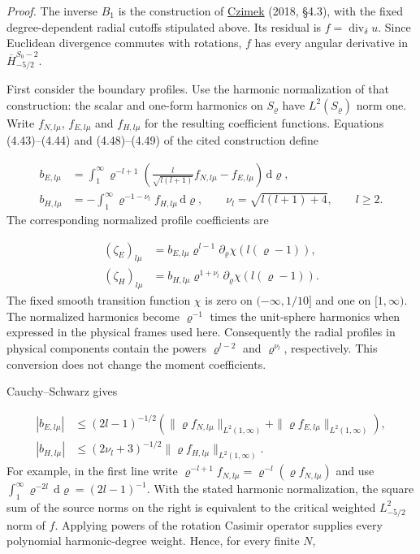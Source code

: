 \documentclass[
  english,
  11pt,
  reqno]{amsart}
\begin{document}
\emph{Proof.} The inverse \(B_1\) is the construction of
\hyperref[ref-Czimek2018]{Czimek} (2018, §4.3), with the fixed
degree-dependent radial cutoffs stipulated above. Its residual is
\(f=\operatorname{div}_\delta u\). Since Euclidean divergence commutes
with rotations, \(f\) has every angular derivative in
\(\overline H^{S_0-2}_{-5/2}\).

First consider the boundary profiles. Use the harmonic normalization of
that construction: the scalar and one-form harmonics on \(S_\varrho\)
have \(L^2(S_\varrho)\) norm one. Write \(f_{N,l\mu}\), \(f_{E,l\mu}\)
and \(f_{H,l\mu}\) for the resulting coefficient functions. Equations
(4.43)--(4.44) and (4.48)--(4.49) of the cited construction define

\label{eq:online-momentum-profile-moments} \[
\begin{aligned}
b_{E,l\mu}
 &=\int_1^\infty \varrho^{-l+1}
       \left(\frac{l}{\sqrt{l(l+1)}}f_{N,l\mu}
                          -f_{E,l\mu}\right)\,\mathrm d\varrho,\\
b_{H,l\mu}
 &=-\int_1^\infty \varrho^{-1-\nu_l}f_{H,l\mu}\,\mathrm d\varrho,
\qquad \nu_l=\sqrt{l(l+1)+4},\qquad l\ge2.
\end{aligned}
\] The corresponding normalized profile coefficients are

\label{eq:online-momentum-profile-coefficients} \[
\begin{aligned}
(\zeta_E)_{l\mu}
 &=b_{E,l\mu}\varrho^{l-1}
       \partial_\varrho\chi(l(\varrho-1)),\\
(\zeta_H)_{l\mu}
 &=b_{H,l\mu}\varrho^{1+\nu_l}
       \partial_\varrho\chi(l(\varrho-1)).
\end{aligned}
\] The fixed smooth transition function \(\chi\) is zero on
\((-\infty,1/10]\) and one on \([1,\infty)\). The normalized harmonics
become \(\varrho^{-1}\) times the unit-sphere harmonics when expressed
in the physical frames used here. Consequently the radial profiles in
physical components contain the powers \(\varrho^{l-2}\) and
\(\varrho^{\nu_l}\), respectively. This conversion does not change the
moment coefficients.

Cauchy--Schwarz gives

\label{eq:online-momentum-moment-bounds} \[
\begin{aligned}
|b_{E,l\mu}|
 &\le(2l-1)^{-1/2}
       \left(\|\varrho f_{N,l\mu}\|_{L^2(1,\infty)}
             +\|\varrho f_{E,l\mu}\|_{L^2(1,\infty)}\right),\\
|b_{H,l\mu}|
 &\le(2\nu_l+3)^{-1/2}
                  \|\varrho f_{H,l\mu}\|_{L^2(1,\infty)}.
\end{aligned}
\] For example, in the first line write
\(\varrho^{-l+1}f_{N,l\mu}=\varrho^{-l}(\varrho f_{N,l\mu})\) and use
\(\int_1^\infty\varrho^{-2l}\,\mathrm d\varrho=(2l-1)^{-1}\). With the
stated harmonic normalization, the square sum of the source norms on the
right is equivalent to the critical weighted \(L^2_{-5/2}\) norm of
\(f\). Applying powers of the rotation Casimir operator supplies every
polynomial harmonic-degree weight. Hence, for every finite \(N\),
\end{document}
